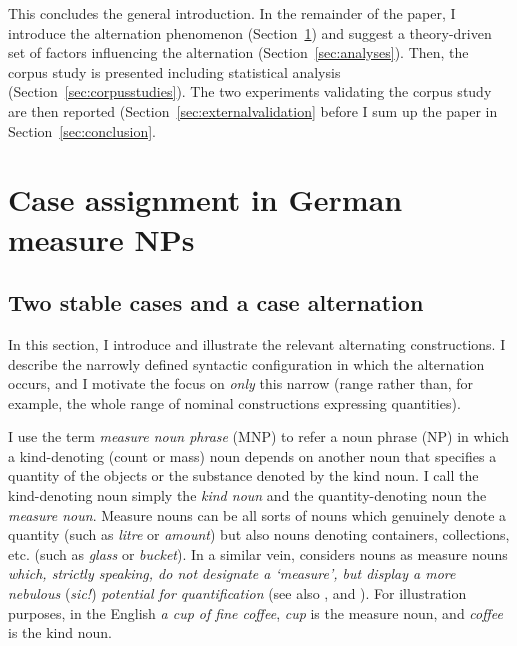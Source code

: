 \documentclass[USenglish]{article}
\begin{document}
This concludes the general introduction.
In the remainder of the paper, I introduce the alternation phenomenon (Section~\ref{sec:germanmeasurenps}) and suggest a theory-driven set of factors influencing the alternation (Section~\ref{sec:analyses}).
Then, the corpus study is presented including statistical analysis (Section~\ref{sec:corpusstudies}).
The two experiments validating the corpus study are then reported (Section~\ref{sec:externalvalidation} before I sum up the paper in Section~\ref{sec:conclusion}.




\section{Case assignment in German measure NPs}
\label{sec:germanmeasurenps}


\subsection{Two stable cases and a case alternation}
\label{sec:descriptive}

In this section, I introduce and illustrate the relevant alternating constructions.
I describe the narrowly defined syntactic configuration in which the alternation occurs, and I motivate the focus on \textit{only} this narrow (range rather than, for example, the whole range of nominal constructions expressing quantities).

I use the term \textit{measure noun phrase} (MNP) to refer a noun phrase (NP) in which a kind-denoting (count or mass) noun depends on another noun that specifies a quantity of the objects or the substance denoted by the kind noun.
I call the kind-denoting noun simply the \textit{kind noun} and the quantity-denoting noun the \textit{measure noun}.
Measure nouns can be all sorts of nouns which genuinely denote a quantity (such as \textit{litre} or \textit{amount}) but also nouns denoting containers, collections, etc. (such as \textit{glass} or \textit{bucket}).
In a similar vein, \citet[284]{Brems2003} considers nouns as measure nouns \textit{which, strictly speaking, do not designate a `measure', but display a more nebulous} (\textit{sic!}) \textit{potential for quantification} (see also \citealp[530]{Koptjevskaja2001}, and \citealp[338]{Rutkowski2007}).
For illustration purposes, in the English \textit{a cup of fine coffee}, \textit{cup} is the measure noun, and \textit{coffee} is the kind noun.
\end{document}
